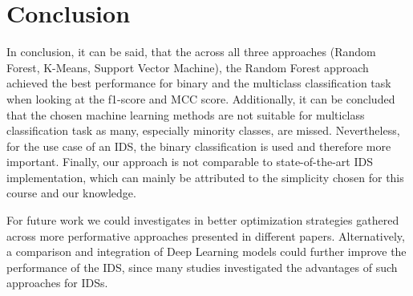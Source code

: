 \section{Conclusion}
In conclusion, it can be said, that the across all three approaches (Random Forest, K-Means, Support Vector Machine), the Random Forest approach achieved the best performance for binary and the multiclass classification task when looking at the f1-score and MCC score.
Additionally, it can be concluded that the chosen machine learning methods are not suitable for multiclass classification task as many, especially minority classes, are missed.
Nevertheless, for the use case of an IDS, the binary classification is used and therefore more important.
Finally, our approach is not comparable to state-of-the-art IDS implementation, which can mainly be attributed to the simplicity chosen for this course and our knowledge.

\nextparagraph
For future work we could investigates in better optimization strategies gathered across more performative approaches presented in different papers.
Alternatively, a comparison and integration of Deep Learning models could further improve the performance of the IDS, since many studies investigated the advantages of such approaches for IDSs.